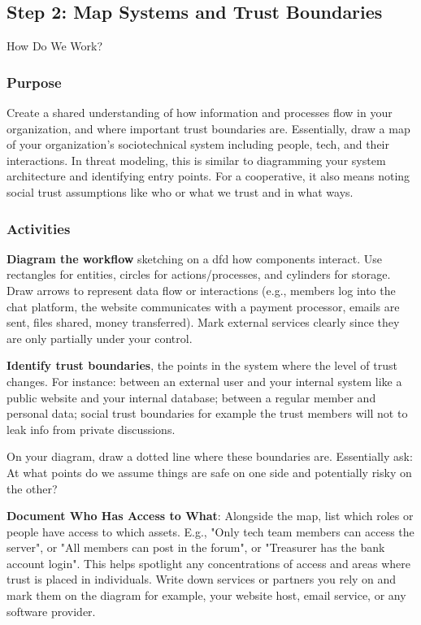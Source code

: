 \subsection{Step 2: Map Systems and Trust Boundaries}
\label{subsec:Step2}

How Do We Work?

\subsubsection{Purpose}

Create a shared understanding of how information and processes flow in your
organization, and where important trust boundaries are. Essentially, draw a map of your
organization's sociotechnical system including people, tech, and their
interactions. In threat modeling, this is similar to diagramming your system
architecture and identifying entry points. For a cooperative, it also means
noting social trust assumptions like who or what we trust and in what ways.

\subsubsection{Activities}

\textbf{Diagram the workflow} sketching on a \gls{dfd} how components interact.
Use rectangles for entities, circles for actions/processes, and cylinders for storage.
Draw arrows to represent data flow or interactions (e.g., members log into the chat platform,
the website communicates with a payment processor, emails are sent, files shared, money transferred).
Mark external services clearly since they are only partially under your control.

\textbf{Identify trust boundaries}, the points in the system where the
level of trust changes. For instance: between an external user and your
internal system like a public website and your internal database; between
a regular member and personal data; social trust boundaries for example
the trust members will not to leak info from private discussions.

On your diagram, draw a dotted line where these boundaries are.
Essentially ask: At what points do we assume things are safe on one side
and potentially risky on the other?

\textbf{Document Who Has Access to What}: Alongside the map, list which roles or people have
access to which assets. E.g., "Only tech team members can access the server", or "All
members can post in the forum", or "Treasurer has the bank account login". This
helps spotlight any concentrations of access and areas where trust is placed in
individuals. Write down services or partners you rely on and mark them on the
diagram for example, your website host, email service, or any software
provider.

